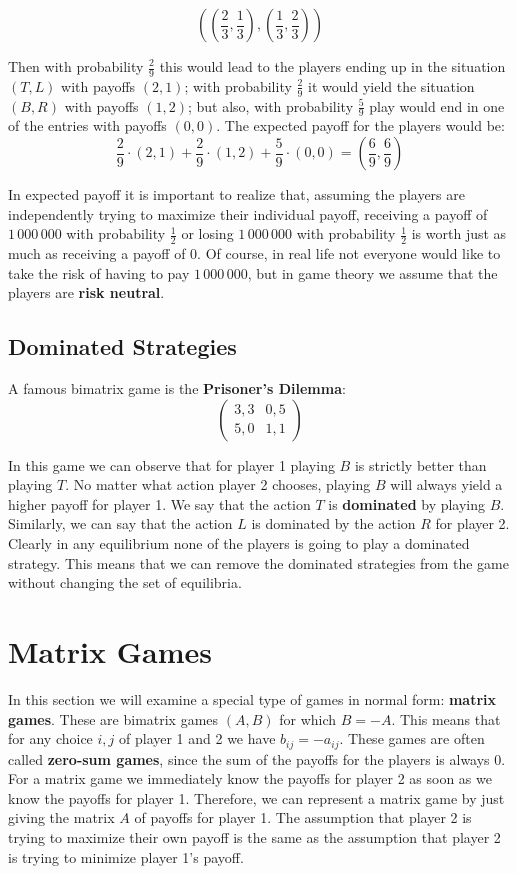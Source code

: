 \documentclass[12pt]{article}
\begin{document}
\[ \left( \left( \frac{2}{3},\frac{1}{3} \right) , \left( \frac{1}{3},\frac{2}{3} \right) \right) \]

\noindent
Then with probability $\frac{2}{9}$ this would lead to the players ending up in the situation $(T, L)$ with payoffs $(2, 1)$; with probability $\frac{2}{9}$ it would yield the situation $(B, R)$ with payoffs $(1, 2)$; but also, with probability $\frac{5}{9}$ play would end in one of the entries with payoffs $(0, 0)$.
The expected payoff for the players would be:
\[ \frac{2}{9} \cdot (2, 1) + \frac{2}{9} \cdot (1, 2) + \frac{5}{9} \cdot (0, 0) = \left( \frac{6}{9},\frac{6}{9} \right) \]

\noindent
In expected payoff it is important to realize that, assuming the players are independently trying to maximize their individual payoff, receiving a payoff of $1\,000\,000$ with probability $\frac{1}{2}$ or losing $1\,000\,000$ with probability $\frac{1}{2}$ is worth just as much as receiving a payoff of 0.
Of course, in real life not everyone would like to take the risk of having to pay $1\,000\,000$, but in game theory we assume that the players are \textbf{risk neutral}.

\subsection{Dominated Strategies}
A famous bimatrix game is the \textbf{Prisoner's Dilemma}:
\[ \begin{pmatrix}
    3,3 & 0,5 \\
    5,0 & 1,1
\end{pmatrix} \]

\noindent
In this game we can observe that for player 1 playing $B$ is strictly better than playing $T$.
No matter what action player 2 chooses, playing $B$ will always yield a higher payoff for player 1.
We say that the action $T$ is \textbf{dominated} by playing $B$.
Similarly, we can say that the action $L$ is dominated by the action $R$ for player 2.
Clearly in any equilibrium none of the players is going to play a dominated strategy.
This means that we can remove the dominated strategies from the game without changing the set of equilibria.

%
%
\newpage
\section{Matrix Games}
In this section we will examine a special type of games in normal form: \textbf{matrix games}.
These are bimatrix games $(A, B)$ for which $B = -A$.
This means that for any choice $i, j$ of player 1 and 2 we have $b_{ij} = -a_{ij}$.
These games are often called \textbf{zero-sum games}, since the sum of the payoffs for the players is always 0.
For a matrix game we immediately know the payoffs for player 2 as soon as we know the payoffs for player 1.
Therefore, we can represent a matrix game by just giving the matrix $A$ of payoffs for player 1.
The assumption that player 2 is trying to maximize their own payoff is the same as the assumption that player 2 is trying to minimize player 1's payoff.
\end{document}
